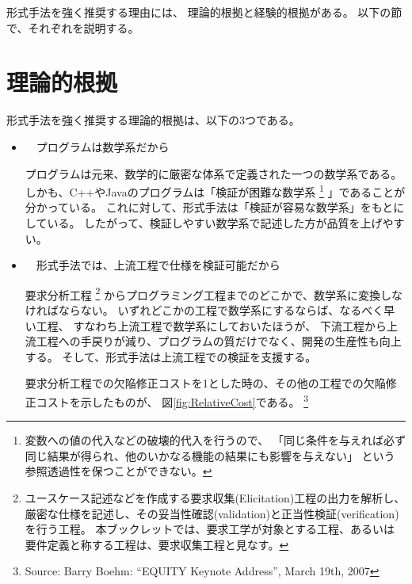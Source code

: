 形式手法を強く推奨する理由には、
理論的根拠と経験的根拠がある。
以下の節で、それぞれを説明する。

\section {理論的根拠}

	形式手法を強く推奨する理論的根拠は、以下の3つである。

\begin{itemize}
\item　プログラムは数学系だから

	プログラムは元来、数学的に厳密な体系で定義された一つの数学系である。
	しかも、C++やJavaのプログラムは「検証が困難な数学系
	\footnote{変数への値の代入などの破壊的代入を行うので、
	「同じ条件を与えれば必ず同じ結果が得られ、他のいかなる機能の結果にも影響を与えない」
	という参照透過性を保つことができない。}
	」であることが分かっている。
	これに対して、形式手法は「検証が容易な数学系」をもとにしている。
	したがって、検証しやすい数学系で記述した方が品質を上げやすい。
	


\item　形式手法では、上流工程で仕様を検証可能だから

	要求分析工程
	\footnote{ユースケース記述などを作成する要求収集(Elicitation)工程の出力を解析し、
	厳密な仕様を記述し、その妥当性確認(validation)と正当性検証(verification)を行う工程。
	本ブックレットでは、要求工学が対象とする工程、あるいは要件定義と称する工程は、要求収集工程と見なす。}
	からプログラミング工程までのどこかで、数学系に変換しなければならない。
	いずれどこかの工程で数学系にするならば、なるべく早い工程、
	すなわち上流工程で数学系にしておいたほうが、
	下流工程から上流工程への手戻りが減り、プログラムの質だけでなく、開発の生産性も向上する。
	そして、形式手法は上流工程での検証を支援する。

	要求分析工程での欠陥修正コストを1とした時の、その他の工程での欠陥修正コストを示したものが、
	図\ref{fig:RelativeCost}である。
		\footnote{Source: Barry Boehm: “EQUITY Keynote Address”, March 19th, 2007}


\end{itemize}
